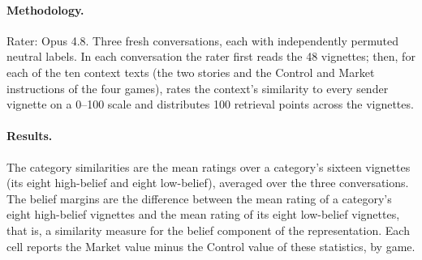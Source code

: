 \documentclass[11pt]{article}
\begin{document}
\paragraph{Methodology.} Rater: Opus 4.8. Three fresh
conversations, each with independently permuted neutral labels. In each conversation the rater first reads
the 48 vignettes; then, for each of the ten context texts (the two stories and
the Control and Market instructions of the four games), rates the context's
similarity to every sender vignette on a 0--100 scale and distributes 100 retrieval
points across the vignettes.

\paragraph{Results.} The category similarities are the mean ratings over a category's sixteen vignettes (its eight high-belief and eight low-belief), averaged over the three conversations. The belief margins are the difference between the mean rating of a category's eight high-belief vignettes and the mean rating of its eight low-belief vignettes, that is, a similarity measure for the belief component of the representation. Each cell reports the Market value minus the Control value of these statistics, by game.

\end{document}
